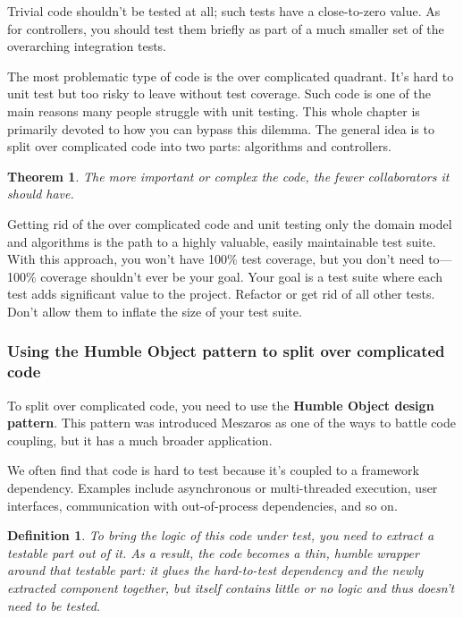 \documentclass{article}
\newtheorem{definition}{Definition}
\newtheorem{theorem}{Theorem}
\begin{document}
Trivial code shouldn’t be tested at all; such tests have a close-to-zero value. As for controllers, you should test them briefly as part of a much smaller set of the overarching integration tests.

The most problematic type of code is the over complicated quadrant. It’s hard to unit test but too risky to leave without test coverage. Such code is one of the main reasons many people struggle with unit testing. This whole chapter is primarily devoted to how you can bypass this dilemma. The general idea is to split over complicated code into two parts: algorithms and controllers.

\begin{theorem}
The more important or complex the code, the fewer collaborators it should have.
\end{theorem}

Getting rid of the over complicated code and unit testing only the domain model and algorithms is the path to a highly valuable, easily maintainable test suite. With this approach, you won’t have 100\% test coverage, but you don’t need to—100\% coverage shouldn’t ever be your goal. Your goal is a test suite where each test adds significant value to the project. Refactor or get rid of all other tests. Don’t allow them to inflate the size of your test suite.

\subsubsection{Using the Humble Object pattern to split over complicated code}

To split over complicated code, you need to use the \textbf{Humble Object design pattern}. This pattern was introduced Meszaros \cite{Meszaros07} as one of the ways to battle code coupling, but it has a much broader application.

We often find that code is hard to test because it’s coupled to a framework dependency. Examples include asynchronous or multi-threaded execution, user interfaces, communication with out-of-process dependencies, and so on.

\begin{definition}
To bring the logic of this code under test, you need to extract a testable part out of it. As a result, the code becomes a thin, humble wrapper around that testable part: it glues the hard-to-test dependency and the newly extracted component together, but itself contains little or no logic and thus doesn’t need to be tested.
\end{definition}
\end{document}
